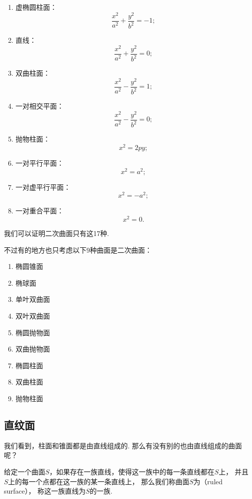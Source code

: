 \begin{enumerate}[label={\chinese*.}]
\begin{enumerate}[label={\arabic*.}]
		\item 虚椭圆柱面：\[
			\frac{x^2}{a^2}+\frac{y^2}{b^2}=-1;
		\]

		\item 直线：\[
			\frac{x^2}{a^2}+\frac{y^2}{b^2}=0;
		\]

		\item 双曲柱面：\[
			\frac{x^2}{a^2}-\frac{y^2}{b^2}=1;
		\]

		\item 一对相交平面：\[
			\frac{x^2}{a^2}-\frac{y^2}{b^2}=0;
		\]

		\item 抛物柱面：\[
			x^2=2py;
		\]

		\item 一对平行平面：\[
			x^2=a^2;
		\]

		\item 一对虚平行平面：\[
			x^2=-a^2;
		\]

		\item 一对重合平面：\[
			x^2=0.
		\]
	\end{enumerate}
\end{enumerate}
我们可以证明二次曲面只有这17种.

不过有的地方也只考虑以下9种曲面是二次曲面：
\begin{enumerate}
	\item 椭圆锥面
	\item 椭球面
	\item 单叶双曲面
	\item 双叶双曲面
	\item 椭圆抛物面
	\item 双曲抛物面
	\item 椭圆柱面
	\item 双曲柱面
	\item 抛物柱面
\end{enumerate}

\subsection{直纹面}
我们看到，柱面和锥面都是由直线组成的.
那么有没有别的也由直线组成的曲面呢？

\begin{definition}
给定一个曲面\(S\)，如果存在一族直线，使得这一族中的每一条直线都在\(S\)上，
并且\(S\)上的每一个点都在这一族的某一条直线上，
那么我们称曲面\(S\)为（ruled surface），
称这一族直线为\(S\)的一族.
\end{definition}

